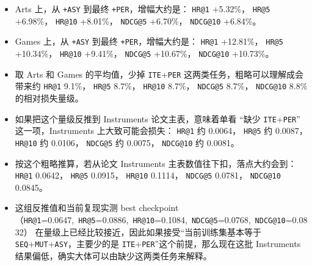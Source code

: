 \documentclass[11pt,a4paper]{ctexart}
\begin{document}
\begin{itemize}
\item Arts 上，从 \texttt{+ASY} 到最终 \texttt{+PER}，增幅大约是：
  \texttt{HR@1} +5.32\%，
  \texttt{HR@5} +6.98\%，
  \texttt{HR@10} +8.01\%，
  \texttt{NDCG@5} +6.70\%，
  \texttt{NDCG@10} +6.84\%。
\item Games 上，从 \texttt{+ASY} 到最终 \texttt{+PER}，增幅大约是：
  \texttt{HR@1} +12.81\%，
  \texttt{HR@5} +10.34\%，
  \texttt{HR@10} +9.41\%，
  \texttt{NDCG@5} +10.67\%，
  \texttt{NDCG@10} +10.73\%。
\item 取 Arts 和 Games 的平均值，少掉 \texttt{ITE}+\texttt{PER} 这两类任务，粗略可以理解成会带来约
  \texttt{HR@1} 9.1\%，
  \texttt{HR@5} 8.7\%，
  \texttt{HR@10} 8.7\%，
  \texttt{NDCG@5} 8.7\%，
  \texttt{NDCG@10} 8.8\%
  的相对损失量级。
\item 如果把这个量级反推到 Instruments 论文主表，意味着单看 “缺少 \texttt{ITE}+\texttt{PER}” 这一项，Instruments 上大致可能会损失：
  \texttt{HR@1} 约 0.0064，
  \texttt{HR@5} 约 0.0087，
  \texttt{HR@10} 约 0.0106，
  \texttt{NDCG@5} 约 0.0075，
  \texttt{NDCG@10} 约 0.0081。
\item 按这个粗略推算，若从论文 Instruments 主表数值往下扣，落点大约会到：
  \texttt{HR@1} 0.0642，
  \texttt{HR@5} 0.0915，
  \texttt{HR@10} 0.1114，
  \texttt{NDCG@5} 0.0781，
  \texttt{NDCG@10} 0.0845。
\item 这组反推值和当前复现实测 best checkpoint
  （\texttt{HR@1}=0.0647,\ \texttt{HR@5}=0.0886,\ \texttt{HR@10}=0.1084,\ \texttt{NDCG@5}=0.0768,\ \texttt{NDCG@10}=0.0832）
  在量级上已经比较接近，因此如果接受“当前训练集基本等于 \texttt{SEQ}+\texttt{MUT}+\texttt{ASY}，主要少的是 \texttt{ITE}+\texttt{PER}”这个前提，那么现在这批 Instruments 结果偏低，确实大体可以由缺少这两类任务来解释。
\end{itemize}
\end{document}
